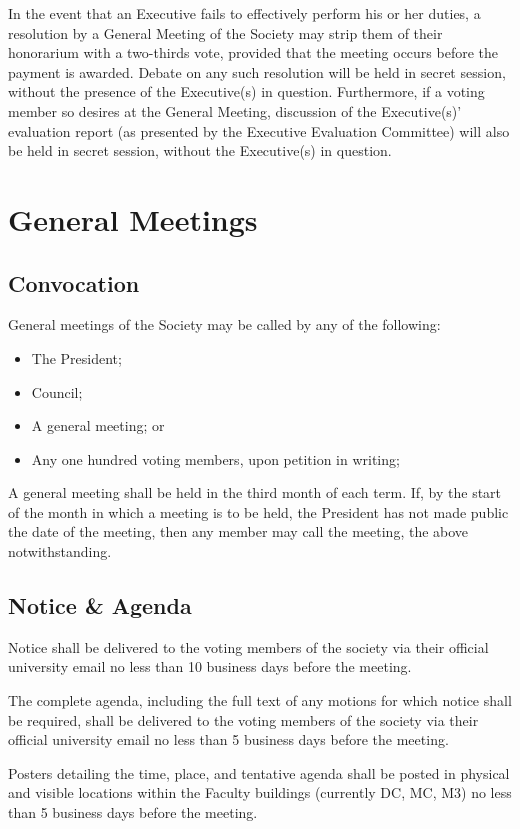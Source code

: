 In the event that an Executive fails to effectively perform his or her duties, a resolution by a General Meeting of the Society may strip them of their honorarium with a two-thirds vote, provided that the meeting occurs before the payment is awarded. Debate on any such resolution will be held in secret session, without the presence of the Executive(s) in question. Furthermore, if a voting member so desires at the General Meeting, discussion of the Executive(s)' evaluation report (as presented by the Executive Evaluation Committee) will also be held in secret session, without the Executive(s) in question.

\section{General Meetings}
\subsection{Convocation}
General meetings of the Society may be called by any of the following:
\begin{itemize}
  \item The President;
  \item Council;
  \item A general meeting; or
  \item Any one hundred voting members, upon petition in writing;
\end{itemize}

A general meeting shall be held in the third month of each term. If, by the
start of the month in which a meeting is to be held, the President has not
made public the date of the meeting, then any member may call the meeting, the
above notwithstanding.

\subsection{Notice \& Agenda}

Notice shall be delivered to the voting members of the society via their official university email no less than 10 business days before the meeting.

The complete agenda, including the full text of any motions for which notice shall be required, shall be delivered to the voting members of the society via their official university email no less than 5 business days before the meeting.

Posters detailing the time, place, and tentative agenda shall be posted in physical and visible locations within the Faculty buildings (currently DC, MC, M3) no less than 5 business days before the meeting.

